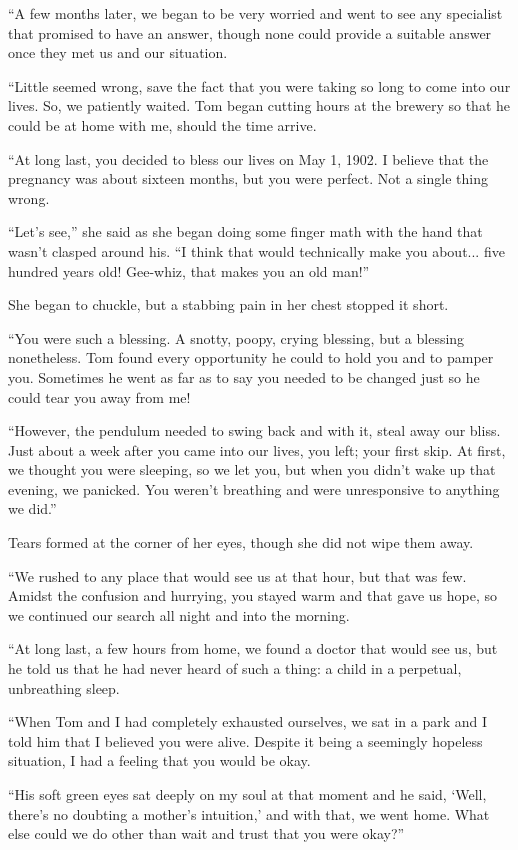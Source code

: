 ``A few months later, we began to be very worried and went to see any specialist that promised to have an answer, though none could provide a suitable answer once they met us and our situation.

``Little seemed wrong, save the fact that you were taking so long to come into our lives. So, we patiently waited. Tom began cutting hours at the brewery so that he could be at home with me, should the time arrive.

``At long last, you decided to bless our lives on May 1, 1902. I believe that the pregnancy was about sixteen months, but you were perfect. Not a single thing wrong.

``Let's see,'' she said as she began doing some finger math with the hand that wasn't clasped around his. ``I think that would technically make you about... five hundred years old! Gee-whiz, that makes you an old man!''

She began to chuckle, but a stabbing pain in her chest stopped it short.

``You were such a blessing. A snotty, poopy, crying blessing, but a blessing nonetheless. Tom found every opportunity he could to hold you and to pamper you. Sometimes he went as far as to say you needed to be changed just so he could tear you away from me!

``However, the pendulum needed to swing back and with it, steal away our bliss. Just about a week after you came into our lives, you left; your first skip. At first, we thought you were sleeping, so we let you, but when you didn't wake up that evening, we panicked. You weren't breathing and were unresponsive to anything we did.''

Tears formed at the corner of her eyes, though she did not wipe them away.

``We rushed to any place that would see us at that hour, but that was few. Amidst the confusion and hurrying, you stayed warm and that gave us hope, so we continued our search all night and into the morning.

``At long last, a few hours from home, we found a doctor that would see us, but he told us that he had never heard of such a thing: a child in a perpetual, unbreathing sleep.

``When Tom and I had completely exhausted ourselves, we sat in a park and I told him that I believed you were alive. Despite it being a seemingly hopeless situation, I had a feeling that you would be okay.

``His soft green eyes sat deeply on my soul at that moment and he said, `Well, there's no doubting a mother's intuition,' and with that, we went home. What else could we do other than wait and trust that you were okay?''

